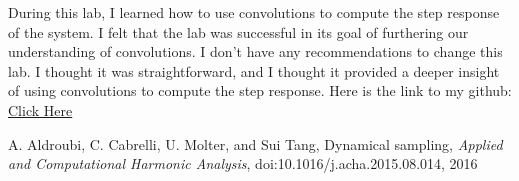 \documentclass[12pt]{report}
\begin{document}
During this lab, I learned how to use convolutions to compute the step response of the system. I felt that the lab was successful in its goal of furthering our understanding of convolutions. I don't have any recommendations to change this lab. I thought it was straightforward, and I thought it provided a deeper insight of using convolutions to compute the step response. Here is the link to my github: \href{https://github.com/JMac1999}{Click Here}

\newpage


\begin{thebibliography}{111}

A. Aldroubi, C. Cabrelli, U. Molter, and Sui Tang,
Dynamical sampling, 
{\it  Applied and Computational Harmonic Analysis}, doi:10.1016/j.acha.2015.08.014, 2016


\end{thebibliography}
\end{document}
